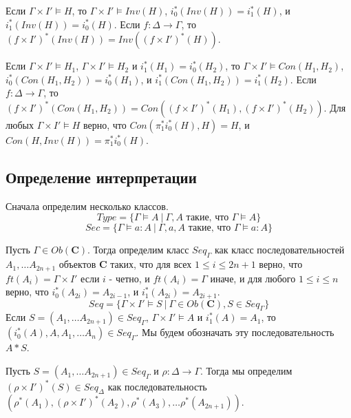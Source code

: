 \documentclass{amsart}
\theoremstyle{definition}
\theoremstyle{remark}
\newcommand{\cat}[1]{\mathbf{#1}}
\renewcommand{\C}{\cat{C}}
\numberwithin{figure}{section}
\begin{document}
Если $\Gamma \times I' \models H$, то $\Gamma \times I' \models Inv(H)$, $i_0^*(Inv(H)) = i_1^*(H)$, и $i_1^*(Inv(H)) = i_0^*(H)$.
Если $f : \Delta \to \Gamma$, то $(f \times I')^*(Inv(H)) = Inv((f \times I')^*(H))$.

Если $\Gamma \times I' \models H_1$, $\Gamma \times I' \models H_2$ и $i_1^*(H_1) = i_0^*(H_2)$, то $\Gamma \times I' \models Con(H_1, H_2)$, $i_0^*(Con(H_1, H_2)) = i_0^*(H_1)$, и $i_1^*(Con(H_1, H_2)) = i_1^*(H_2)$.
Если $f : \Delta \to \Gamma$, то $(f \times I')^*(Con(H_1, H_2)) = Con((f \times I')^*(H_1), (f \times I')^*(H_2))$.
Для любых $\Gamma \times I' \models H$ верно, что $Con(\pi_1^* i_0^*(H), H) = H$, и $Con(H, Inv(H)) = \pi_1^* i_0^*(H)$.

\subsection{Определение интерпретации}

Сначала определим несколько классов.
\[ Type = \{ \Gamma \models A\ |\ \Gamma, A \text{ такие, что } \Gamma \models A \} \]
\[ Sec = \{ \Gamma \models a : A\ |\ \Gamma, a, A \text{ такие, что } \Gamma \models a : A \} \]

Пусть $\Gamma \in Ob(\C)$.
Тогда определим класс $Seq_\Gamma$ как класс последовательностей $A_1, \ldots A_{2 n + 1}$ объектов $\C$ таких, что для всех $1 \leq i \leq 2 n + 1$ верно, что $ft(A_i) = \Gamma \times I'$ если $i$ - четно, и $ft(A_i) = \Gamma$ иначе, и
для любого $1 \leq i \leq n$ верно, что $i_0^*(A_{2 i}) = A_{2 i - 1}$, и $i_1^*(A_{2 i}) = A_{2 i + 1}$.
\[ Seq = \{ \Gamma \times I' \models S\ |\ \Gamma \in Ob(\C), S \in Seq_\Gamma \} \]
Если $S = (A_1, \ldots A_{2 n + 1}) \in Seq_\Gamma$, $\Gamma \times I' \models A$ и $i_1^*(A) = A_1$, то $(i_0^*(A), A, A_1, \ldots A_n) \in Seq_\Gamma$.
Мы будем обозначать эту последовательность $A * S$.

Пусть $S = (A_1, \ldots A_{2 n + 1}) \in Seq_\Gamma$ и $\rho : \Delta \to \Gamma$.
Тогда мы определим $(\rho \times I')^*(S) \in Seq_\Delta$ как последовательность $(\rho^*(A_1), (\rho \times I')^*(A_2), \rho^*(A_3), \ldots \rho^*(A_{2 n + 1}))$.
\end{document}

